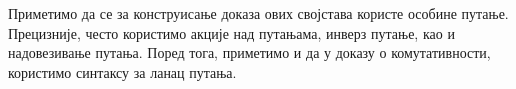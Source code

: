 \begin{code}
\\
\>[0]\AgdaSpace{}%
\AgdaSymbol{(}\AgdaSpace{}%
\AgdaSymbol{)}\AgdaSpace{}%
\AgdaSpace{}%
\AgdaSpace{}%
\AgdaSymbol{=}\AgdaSpace{}%
\AgdaSpace{}%
\AgdaSpace{}%
\AgdaSymbol{(}\AgdaSpace{}%
\AgdaSpace{}%
\AgdaSpace{}%
\AgdaSymbol{)}\<%
\\
%
\\[\AgdaEmptyExtraSkip]%
\>[0]\AgdaSpace{}%
\AgdaSymbol{:}\AgdaSpace{}%
\AgdaSymbol{(}\AgdaSpace{}%
\AgdaSpace{}%
\AgdaSymbol{:}\AgdaSpace{}%
\AgdaSymbol{)}\AgdaSpace{}%
\AgdaSpace{}%
\AgdaSpace{}%
\AgdaSpace{}%
\AgdaSpace{}%
\AgdaOperator{\AgdaFunction{==}}\AgdaSpace{}%
\AgdaSpace{}%
\AgdaSpace{}%
\<%
\\
\>[0]\AgdaSpace{}%
\AgdaSpace{}%
\AgdaSpace{}%
\AgdaSymbol{=}\AgdaSpace{}%
\AgdaSpace{}%
\AgdaSpace{}%
\<%
\\
\>[0]\AgdaSpace{}%
\AgdaSymbol{(}\AgdaSpace{}%
\AgdaSymbol{)}\AgdaSpace{}%
\AgdaSpace{}%
\AgdaSymbol{=}%
\>[2042I]\AgdaSymbol{(}\AgdaSpace{}%
\AgdaSymbol{(}\AgdaSpace{}%
\AgdaSpace{}%
\AgdaSymbol{))}%
\>[45]\AgdaSpace{}%
\AgdaSpace{}%
\AgdaSpace{}%
\AgdaSymbol{(}\AgdaSpace{}%
\AgdaSpace{}%
\AgdaSymbol{)}\AgdaSpace{}%
\<%
\\
\>[.][@{}l@{}]\<[2042I]%
\>[28]\AgdaSymbol{((}\AgdaSpace{}%
\AgdaSymbol{(}\AgdaSpace{}%
\AgdaSpace{}%
\AgdaSymbol{))}\AgdaSpace{}%
\AgdaSpace{}%
\AgdaSpace{}%
\AgdaSpace{}%
\AgdaSpace{}%
\AgdaSpace{}%
\<%
\\
%
\>[28]\AgdaSymbol{((}\AgdaSpace{}%
\AgdaSpace{}%
\AgdaSpace{}%
\AgdaSymbol{)}%
\>[45]\AgdaSymbol{))}\<%
\end{code}
Приметимо да се за конструисање доказа ових својстава користе особине путање. Прецизније, често користимо акције над путањама, инверз путање, као и надовезивање путања. Поред тога, приметимо и да у доказу о комутативности, користимо синтаксу за ланац путања. 

